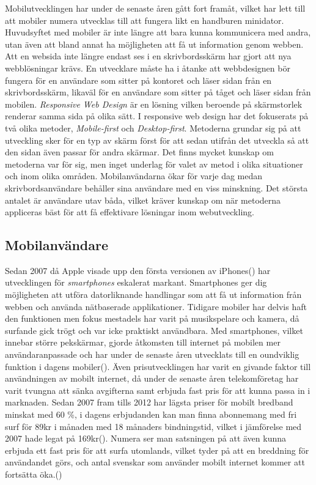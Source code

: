 \documentclass[11pt]{article}
\begin{document}
Mobilutvecklingen har under de senaste åren gått fort framåt, vilket har lett till att mobiler numera utvecklas till att fungera likt en handburen minidator. Huvudsyftet med mobiler är inte längre att bara kunna kommunicera med andra, utan även att bland annat ha möjligheten att få ut information genom webben. Att en websida inte längre endast ses i en skrivbordsskärm har gjort att nya webblösningar krävs. En utvecklare måste ha i åtanke att webbdesignen bör fungera för en användare som sitter på kontoret och läser sidan från en skrivbordsskärm, likaväl för en användare som sitter på tåget och läser sidan från mobilen. \textit{Responsive Web Design} är en lösning vilken beroende på skärmstorlek renderar samma sida på olika sätt. I responsive web design har det fokuserats på två olika metoder, \textit{Mobile-first} och \textit{Desktop-first}. Metoderna grundar sig på att utveckling sker för en typ av skärm först för att sedan utifrån det utveckla så att den sidan även passar för andra skärmar. Det finns mycket kunskap om metoderna var för sig, men inget underlag för valet av metod i olika situationer och inom olika områden. Mobilanvändarna ökar för varje dag medan skrivbordsanvändare behåller sina användare med en viss minskning. Det största antalet är användare utav båda, vilket kräver kunskap om när metoderna appliceras bäst för att få effektivare lösningar inom webutveckling.

\subsection{Mobilanvändare}

Sedan 2007 då Apple visade upp den första versionen av iPhones(\cite{AppleRevolution}) har utvecklingen för \textit{smartphones} eskalerat markant. Smartphones ger dig möjligheten att utföra datorliknande handlingar som att få ut information från webben och använda nätbaserade applikationer. Tidigare mobiler har delvis haft den funktionen men fokus mestadels har varit på musikspelare och kamera, då surfande gick trögt och var icke praktiskt användbara.
Med smartphones, vilket innebar större pekskärmar, gjorde åtkomsten till internet på mobilen mer användaranpassade och har under de senaste åren utvecklats till en oundviklig funktion i dagens mobiler(\cite[s. 4]{Cfigroup_2009}).  Även prisutvecklingen har varit en givande faktor till användningen av mobilt internet, då under de senaste åren telekomföretag har varit tvungna att sänka avgifterna samt erbjuda fast pris för att kunna passa in i marknaden. Sedan 2007 fram tills 2012 har lägsta priser för mobilt bredband minskat med 60 \%, i dagens erbjudanden kan man finna abonnemang med fri surf för 89kr i månaden med 18 månaders bindningstid, vilket i jämförelse med 2007 hade legat på 169kr(\cite[s. 36]{pts}). Numera ser man satsningen på att även kunna erbjuda ett fast pris för att surfa utomlands, vilket tyder på att en breddning för användandet görs, och antal svenskar som använder mobilt internet kommer att fortsätta öka.(\cite{telekomidag})
\end{document}
